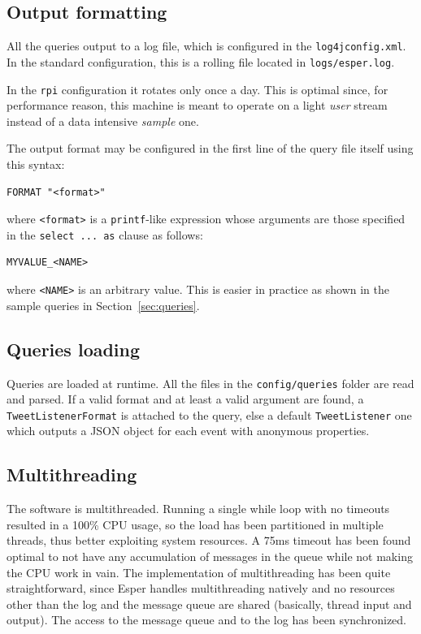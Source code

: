 \documentclass[a4paper]{article}
\begin{document}
\subsection{Output formatting}
All the queries output to a log file, which is configured in the \lstinline$log4jconfig.xml$. In the standard configuration, this is a rolling file located in \lstinline$logs/esper.log$.\par
In the \lstinline$rpi$ configuration it rotates only once a day. This is optimal since, for performance reason, this machine is meant to operate on a light \textit{user} stream instead of a data intensive \textit{sample} one. \par
The output format may be configured in the first line of the query file itself using this syntax:
\begin{lstlisting}
FORMAT "<format>"
\end{lstlisting}
where \lstinline$<format>$ is a \lstinline$printf$-like expression whose arguments are those specified in the \lstinline$select ... as$ clause as follows:
\begin{lstlisting}
MYVALUE_<NAME>
\end{lstlisting}
where \lstinline$<NAME>$ is an arbitrary value. This is easier in practice as shown in the sample queries in Section~\ref{sec:queries}.

\subsection{Queries loading}
Queries are loaded at runtime. All the files in the \lstinline$config/queries$ folder are read and parsed. If a valid format and at least a valid argument are found, a \lstinline$TweetListenerFormat$ is attached to the query, else a default \lstinline$TweetListener$ one which outputs a JSON object for each event with anonymous properties.

\subsection{Multithreading}
The software is multithreaded. Running a single while loop with no timeouts resulted in a 100\% CPU usage, so the load has been partitioned in multiple threads, thus better exploiting system resources. A 75ms timeout has been found optimal to not have any accumulation of messages in the queue while not making the CPU work in vain. The implementation of multithreading has been quite straightforward, since Esper handles multithreading natively and no resources other than the log and the message queue are shared (basically, thread input and output). The access to the message queue and to the log has been synchronized.
\end{document}

